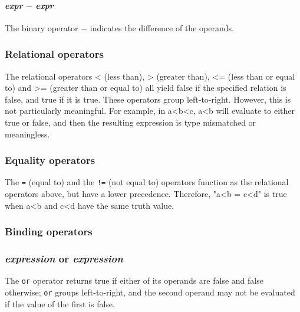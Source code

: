 \paragraph{\textit{expr} $-$ \textit{expr}}
The binary operator $-$ indicates the difference of the operands.
\\
\subsubsection{Relational operators}
The  relational operators < (less than), > (greater than), <= (less than or equal to) and >= (greater than or equal to) all yield false if the specified relation is false, and true if it is true. These operators group left-to-right. However, this is not particularly meaningful. For example, in a<b<c, a<b will evaluate to either true or false, and then the resulting expression is type mismatched or meaningless.

\begin{alltt}
\quad {} \term{<} 
\quad {} \term{>} 
\quad {} \term{<=} 
\quad {} \term{>=} 
\end{alltt}

\subsubsection{Equality operators}
The \texttt{=} (equal to) and the \texttt{!=} (not equal to) operators function as the relational operators above, but have a lower precedence. Therefore, "a<b = c<d" is true when a<b and c<d have the same truth value.
\\
\begin{alltt}
\quad {} \term{=} 
\quad {} \term{!=} 
\end{alltt}

\subsubsection{Binding operators}

\subsubsection{\textit{expression} or \textit{expression}}
The \texttt{or} operator returns true if either of its operands are false and false otherwise; \texttt{or} groups left-to-right, and the second operand may not be evaluated if the value of the first is false.


